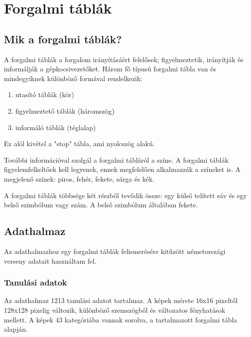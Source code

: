 \chapter{Forgalmi táblák}\label{ch:SIGNS}

\section{Mik a forgalmi táblák?}\label{sec:SIGNS:whatAreThey}

A forgalmi táblák a forgalom irányításáért felelősek; figyelmeztetik, irányítják és informálják a gépkocsivezetőket. Három fő típusú forgalmi tábla van és mindegyiknek különböző formával rendelkezik:
\begin{enumerate}
	\item utasító táblák (kör)
	\item figyelmeztető táblák (háromszög)
	\item informáló táblák (téglalap)
\end{enumerate}

Ez alól kivétel a "stop" tábla, ami nyolcszög alakú.

További információval szolgál a forgalmi tábláról a színe. A forgalmi táblák figyelemfelkeltőek kell legyenek, ennek megfelelően alkalmazzák a színeket is. A megjelenő színek: piros, fehér, fekete, sárga és kék. \citep{8}

A forgalmi táblák többsége két részből tevődik össze: egy külső telített sáv és egy belső szimbólum vagy szám. A belső szimbólum általában fekete. 


\section{Adathalmaz}\label{sec:SIGNS:dataSet}

Az adathalmazhoz egy forgalmi táblák felismerésére kitűzött németországi verseny adatait használtam fel.

\subsection{Tanulási adatok}

Az adathalmaz 1213 tanulási adatot tartalmaz. A képek mérete 16x16 pixeltől 128x128 pixelig változik, különböző szemszögből és változatos fényhatások mellett. A képek 43 kategóriába vannak sorolva, a tartalmazott forgalmi tábla alapján.

